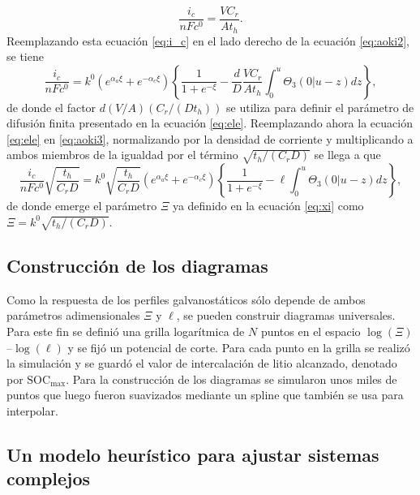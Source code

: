 \begin{equation}\label{eq:i_c}
    \frac{i_c}{n F c^0} = \frac{V C_r}{A t_h}.
\end{equation}
Reemplazando esta ecuación \ref{eq:i_c} en el lado derecho de la ecuación 
\ref{eq:aoki2}, se tiene
\begin{equation}\label{eq:aoki3}
    \frac{i_c}{n F c^0} = k^0 \left(e^{\alpha_a \xi} + e^{-\alpha_c \xi}\right) \left\{ \frac{1}{1+e^{-\xi}} - \frac{d}{D} \frac{V C_r}{A t_h} \int_0^u \Theta_3(0|u - z) dz \right\},
\end{equation}
de donde el factor $d (V/A) (C_r / (D t_h))$ se utiliza para definir el 
parámetro de difusión finita presentado en la ecuación \ref{eq:ele}. Reemplazando 
ahora la ecuación \ref{eq:ele} en \ref{eq:aoki3}, normalizando por la densidad 
de corriente y multiplicando a ambos miembros de la igualdad por el término 
$\sqrt{t_h / (C_r D)}$ se llega a que
\begin{equation}\label{eq:aoki4}
    \frac{i_c}{n F c^0} \sqrt{\frac{t_h}{C_r D}} = k^0 \sqrt{\frac{t_h}{C_r D}}\left(e^{\alpha_a \xi} + e^{-\alpha_c \xi}\right) \left\{ \frac{1}{1+e^{-\xi}} - \ell \int_0^u \Theta_3(0|u - z) dz \right\},
\end{equation}
de donde emerge el parámetro $\Xi$ ya definido en la ecuación \ref{eq:xi} como 
$\Xi = k^0 \sqrt{t_h / (C_r D)}$.


\subsection{Construcción de los diagramas}

Como la respuesta de los perfiles galvanostáticos sólo depende de ambos parámetros
adimensionales $\Xi$ y $\ell$, se pueden construir diagramas universales. Para 
este fin se definió una grilla logarítmica de $N$ puntos en el espacio 
$\log(\Xi)$--$\log(\ell)$ y se fijó un potencial de corte. Para cada punto en la 
grilla se realizó la simulación y se guardó el valor de intercalación de litio
alcanzado, denotado por $\text{SOC}_{\max}$. Para la construcción de los diagramas 
se simularon unos miles de puntos que luego fueron suavizados mediante un spline
que también se usa para interpolar.


\subsection{Un modelo heurístico para ajustar sistemas complejos}

